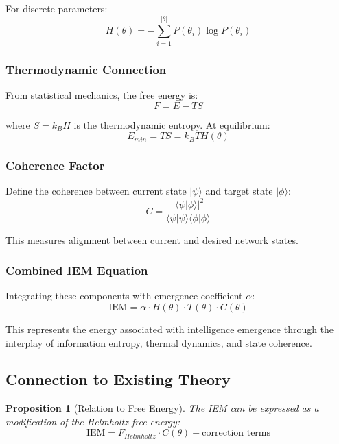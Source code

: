 \documentclass[12pt]{article}
\newtheorem{proposition}[theorem]{Proposition}
\begin{document}
For discrete parameters:
\begin{equation}
H(\theta) = -\sum_{i=1}^{|\theta|} P(\theta_i) \log P(\theta_i)
\end{equation}

\subsubsection{Thermodynamic Connection}

From statistical mechanics, the free energy is:
\begin{equation}
F = E - TS
\end{equation}

where $S = k_B H$ is the thermodynamic entropy. At equilibrium:
\begin{equation}
E_{min} = TS = k_B T H(\theta)
\end{equation}

\subsubsection{Coherence Factor}

Define the coherence between current state $|\psi\rangle$ and target state $|\phi\rangle$:
\begin{equation}
C = \frac{|\langle \psi | \phi \rangle|^2}{\langle \psi | \psi \rangle \langle \phi | \phi \rangle}
\end{equation}

This measures alignment between current and desired network states.

\subsubsection{Combined IEM Equation}

Integrating these components with emergence coefficient $\alpha$:
\begin{equation}
\text{IEM} = \alpha \cdot H(\theta) \cdot T(\theta) \cdot C(\theta)
\end{equation}

This represents the energy associated with intelligence emergence through the interplay of information entropy, thermal dynamics, and state coherence.

\subsection{Connection to Existing Theory}

\begin{proposition}[Relation to Free Energy]
The IEM can be expressed as a modification of the Helmholtz free energy:
\begin{equation}
\text{IEM} = F_{Helmholtz} \cdot C(\theta) + \text{correction terms}
\end{equation}
\end{proposition}
\end{document}
